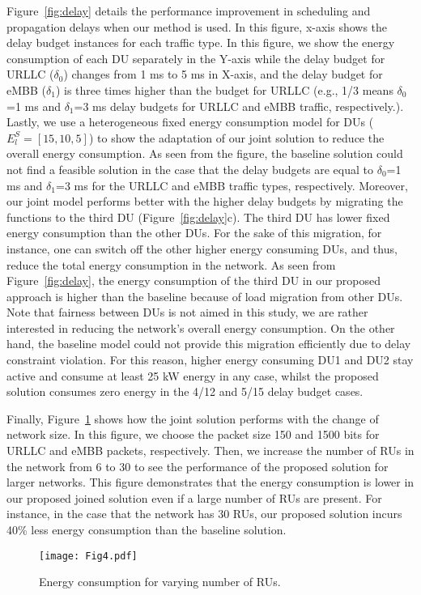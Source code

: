 \documentclass[conference]{IEEEtran}
\begin{document}
\par Figure~\ref{fig:delay} details the performance improvement in scheduling and propagation delays when our method is used. In this figure, x-axis shows the delay budget instances for each traffic type. In this figure, we show the energy consumption of each DU separately in the Y-axis while the delay budget for URLLC  ($\delta_{0}$) changes from 1 ms to 5 ms in X-axis, and the delay budget for eMBB ($\delta_{1}$) is three times higher than the budget for URLLC (e.g., 1/3 means $\delta_{0}$=1 ms and $\delta_{1}$=3 ms delay budgets for URLLC and eMBB traffic, respectively.). Lastly, we use a heterogeneous fixed energy consumption model for DUs ($E_{l}^S = [15,10,5]$) to show the adaptation of our joint solution to reduce the overall energy consumption. As seen from the figure, the baseline solution could not find a feasible solution in the case that the delay budgets are equal to $\delta_{0}$=1 ms and $\delta_{1}$=3 ms for the URLLC and eMBB traffic types, respectively. Moreover, our joint model performs better with the higher delay budgets by migrating the functions to the third DU (Figure~\ref{fig:delay}c). The third DU has lower fixed energy consumption than the other DUs. For the sake of this migration, for instance, one can switch off the other higher energy consuming DUs, and thus, reduce the total energy consumption in the network. As seen from Figure~\ref{fig:delay}, the energy consumption of the third DU in our proposed approach is higher than the baseline because of load migration from other DUs.  Note that fairness between DUs is not aimed in this study, we are rather interested in reducing the network's overall energy consumption. On the other hand, the baseline model could not provide this migration efficiently due to delay constraint violation. For this reason, higher energy consuming DU1 and DU2 stay active and consume at least 25 kW energy in any case, whilst the proposed solution consumes zero energy in the 4/12 and 5/15 delay budget cases.  

\par Finally, Figure~\ref{fig:support} shows how the joint solution performs with the change of network size. In this figure, we choose the packet size 150 and 1500 bits for URLLC and eMBB packets, respectively. Then, we increase the number of RUs in the network from 6 to 30 to see the performance of the proposed solution for larger networks. This figure demonstrates that the energy consumption is lower in our proposed joined solution even if a large number of RUs are present. For instance, in the case that the network has 30 RUs, our proposed solution incurs 40\% less energy consumption than the baseline solution. 
\begin{figure}
\centering
\texttt{[image: Fig4.pdf]}
\caption{\label{fig:support} Energy consumption for varying number of RUs.}
\end{figure}
\end{document}

